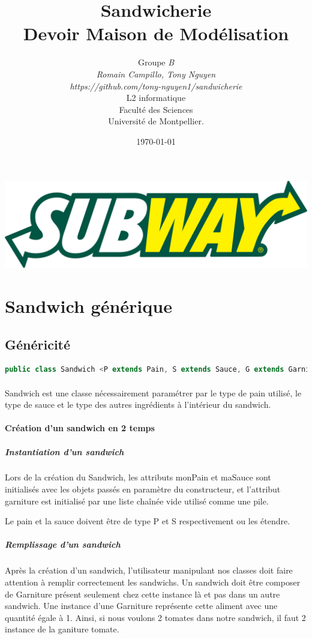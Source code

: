 \documentclass[a4paper]{article}
\title{Sandwicherie\\         %
Devoir Maison de Modélisation}
\author{Groupe \emph{B}\\
  \emph{Romain Campillo, Tony Nguyen}\\
  \emph{https://github.com/tony-nguyen1/sandwicherie}\\
  L2 informatique\\
  Faculté des Sciences\\
Université de Montpellier.}
\date{\today}
\begin{document}
\maketitle
\begin{center}
    \includegraphics[scale=0.09]{./logo.png}
\end{center}
\newpage
\tableofcontents
\clearpage
\section{Sandwich générique}
\subsection{Généricité}

\begin{lstlisting}[language=Java, caption=Entête de class Sandwich]
    public class Sandwich <P extends Pain, S extends Sauce, G extends Garniture>
\end{lstlisting}
\paragraph{}
Sandwich est une classe nécessairement paramétrer par le type de pain utilisé, le type de sauce et le type des autres ingrédients à l'intérieur du sandwich.

\paragraph{Création d'un sandwich en 2 temps}
\subparagraph{Instantiation d'un sandwich}
Lors de la création du Sandwich, les attributs monPain et maSauce sont initialisés avec les objets passés en paramètre du constructeur, et l’attribut garniture est initialisé par une liste chaînée vide utilisé comme une pile.

Le pain et la sauce doivent être de type P et S respectivement ou les étendre.

\subparagraph{Remplissage d'un sandwich}
Après la création d'un sandwich, l'utilisateur manipulant nos classes doit faire attention à remplir correctement les sandwichs. Un sandwich doit être composer de Garniture présent seulement chez cette instance là et pas dans un autre sandwich. Une instance d'une Garniture représente cette aliment avec une quantité égale à 1. Ainsi, si nous voulons 2 tomates dans notre sandwich, il faut 2 instance de la ganiture tomate.
\end{document}

